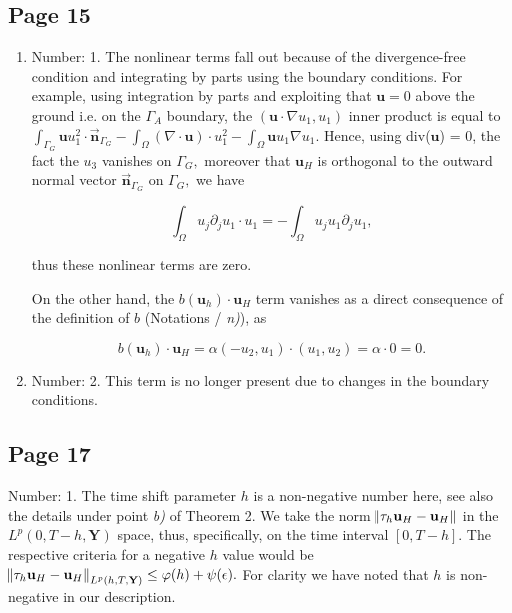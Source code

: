 \documentclass[11pt]{article}
\begin{document}
\subsection{Page 15}

\begin{enumerate}

\item Number: 1. The nonlinear terms fall out because of the divergence-free condition and integrating by parts using the boundary conditions. For example, using integration by parts and exploiting that $\mathbf{u} = 0$ above the ground i.e. on the $\Gamma_A$ boundary, the $(\mathbf{u} \cdot \nabla u_1, u_1)$ inner product is equal to $\int_{\Gamma_G} \mathbf{u} u_1^2 \cdot \boldsymbol{\vec{n}}_{\Gamma_G} - \int_\Omega (\nabla \cdot \mathbf{u}) \cdot u_1^2 - \int_\Omega \mathbf{u} u_1 \nabla u_1.$ Hence, using div($\mathbf{u}$) = 0, the fact the $u_3$ vanishes on $\Gamma_G,$ moreover that $\mathbf{u}_H$ is orthogonal to the outward normal vector $\boldsymbol{\vec{n}}_{\Gamma_G}$ on $\Gamma_G,$ we have

$$ \int_\Omega u_j \partial_j u_1 \cdot u_1 = - \int_\Omega u_j u_1 \partial_j u_1,$$

thus these nonlinear terms are zero.

On the other hand, the $b(\mathbf{u}_h) \cdot \mathbf{u}_H$ term vanishes as a direct consequence of the definition of $b$ (Notations / \textit{n)}), as 

$$b(\mathbf{u}_h) \cdot \mathbf{u}_H = \alpha (-u_2, u_1) \cdot (u_1, u_2) = \alpha \cdot 0 = 0.$$

\item Number: 2. This term is no longer present due to changes in the boundary conditions.

\end{enumerate}

\subsection{Page 17}

Number: 1. The time shift parameter $h$ is a non-negative number here, see also the details under point \textit{b)} of Theorem 2. We take the norm $\norm{\tau_h \mathbf{u}_H - \mathbf{u}_H}$ in the $L^p(0, T-h, \mathbf{Y})$ space, thus, specifically, on the time interval $[0, T-h]$. The respective criteria for a negative $h$ value would be $\norm{\tau_h \mathbf{u}_H - \mathbf{u}_H}_{L^p(h, T, \mathbf{Y})} \leq \varphi(h) + \psi(\epsilon).$ For clarity we have noted that $h$ is non-negative in our description.
\end{document}
